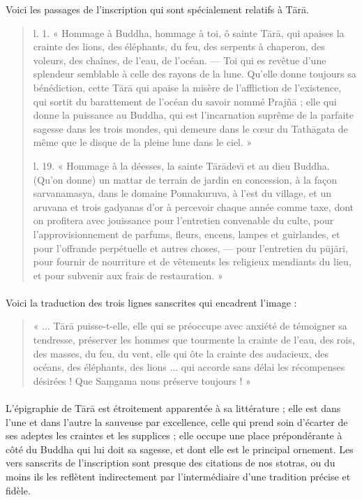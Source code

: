\documentclass[a4paper, 11pt, oneside, french]{article}
\begin{document}
Voici les passages de l'inscription qui sont spécialement relatifs à T\={a}r\={a}.
\begin{quotation}
l. 1. « Hommage à Buddha, hommage à toi, ô sainte T\={a}r\={a}, qui apaises la crainte des lions, des éléphants, du feu, des serpents à chaperon, des voleurs, des chaînes, de l'eau, de l'océan. --- Toi qui es revêtue d'une splendeur semblable à celle des rayons de la lune. Qu'elle donne toujours sa bénédiction, cette T\={a}r\={a} qui apaise la misère de l'affliction de l'existence, qui sortit du barattement de l'océan du savoir nommé Praj\~{n}\={a} ; elle qui donne la puissance au Buddha, qui est l'incarnation suprême de la parfaite sagesse dans les trois mondes, qui demeure dans le cœur du Tath\={a}gata de même que le disque de la pleine lune dans le ciel. »

\bigskip

l. 19. « Hommage à la déesses, la sainte T\={a}r\={a}dev\={\i} et au dieu Buddha. (Qu'on donne) un mattar de terrain de jardin en concession, à la façon sarvanamasya, dans le domaine Ponnakuruva, à l'est du village, et un aruvana et trois gadyanas d'or à percevoir chaque année comme taxe, dont on profitera avec jouissance pour l'entretien convenable du culte, pour l'approvisionnement de parfums, fleurs, encens, lampes et guirlandes, et pour l'offrande perpétuelle et autres choses, --- pour l'entretien du p\={u}j\={a}ri, pour fournir de nourriture et de vêtements les religieux mendiants du lieu, et pour subvenir aux frais de restauration. »
\end{quotation}
\paragraph{}
Voici la traduction des trois lignes sanscrites qui encadrent l'image :
\begin{quotation}
« ... T\={a}r\={a} puisse-t-elle, elle qui se préoccupe avec anxiété de témoigner sa tendresse, préserver les hommes que tourmente la crainte de l'eau, des rois, des masses, du feu, du vent, elle qui ôte la crainte des audacieux, des océans, des éléphants, des lions ... qui accorde sans délai les récompenses désirées ! Que Sa\d{m}gama nous préserve toujours ! »
\end{quotation}
\paragraph{}
L'épigraphie de T\={a}r\={a} est étroitement apparentée à sa littérature ; elle est dans l'une et dans l'autre la sauveuse par excellence, celle qui prend soin d'écarter de ses adeptes les craintes et les supplices ; elle occupe une place prépondérante à côté du Buddha qui lui doit sa sagesse, et dont elle est le principal ornement. Les vers sanscrits de l'inscription sont presque des citations de nos stotras, ou du moins ils les reflètent indirectement par l'intermédiaire d'une tradition précise et fidèle.
\end{document}
